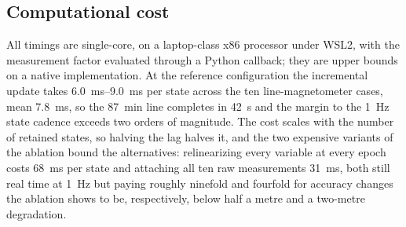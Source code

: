 \subsection{Computational cost}\label{sec:cost}
All timings are single-core, on a laptop-class x86 processor under WSL2, with
the measurement factor evaluated through a Python callback; they are upper
bounds on a native implementation. At the reference configuration the
incremental update takes \SIrange{6.0}{9.0}{\milli\second} per state across the
ten line-magnetometer cases, mean \SI{7.8}{\milli\second}, so the
\SI{87}{\minute} line completes in \SI{42}{\second} and the margin to the
\SI{1}{\hertz} state cadence exceeds two orders of magnitude. The cost scales
with the number of retained states, so halving the lag halves it, and the two
expensive variants of the ablation bound the alternatives: relinearizing every
variable at every epoch costs \SI{68}{\milli\second} per state and attaching
all ten raw measurements \SI{31}{\milli\second}, both still real time at
\SI{1}{\hertz} but paying roughly ninefold and fourfold for accuracy changes
the ablation shows to be, respectively, below half a metre and a two-metre
degradation.
